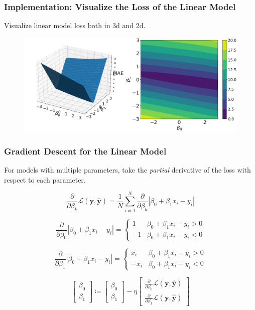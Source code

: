 \documentclass{beamer}
\begin{document}
\begin{frame}
\frametitle{Implementation: Visualize the Loss of the Linear Model}

Visualize linear model loss both in 3d and 2d.

\begin{figure}
\includegraphics[width=\textwidth]{../figures/linear_loss.png}
\end{figure}


\end{frame}

\begin{frame}
\frametitle{Gradient Descent for the Linear Model}

For models with multiple parameters, take the \emph{partial} derivative of the loss with respect to each parameter. 

\[
\frac{\partial}{\partial\beta_{k}}\mathcal{L}(\mathbf{y},\hat{\mathbf{y}})=\frac{1}{N}\sum_{i=1}^{N}\frac{\partial}{\partial\beta_{k}}\left|\beta_{0}+\beta_{1}x_{i}-y_{i}\right|
\]

\[
\frac{\partial}{\partial\beta_{0}}\left|\beta_{0}+\beta_{1}x_{i}-y_{i}\right|=\begin{cases}
1 & \beta_{0}+\beta_{1}x_{i}-y_{i}>0\\
-1 & \beta_{0}+\beta_{1}x_{i}-y_{i}<0
\end{cases}
\]

\[
\frac{\partial}{\partial\beta_{1}}\left|\beta_{0}+\beta_{1}x_{i}-y_{i}\right|=\begin{cases}
x_{i} & \beta_{0}+\beta_{1}x_{i}-y_{i}>0\\
-x_{i} & \beta_{0}+\beta_{1}x_{i}-y_{i}<0
\end{cases}
\]

\[
\left[\begin{array}{c}
\beta_{0}\\
\beta_{1}
\end{array}\right]\coloneqq\left[\begin{array}{c}
\beta_{0}\\
\beta_{1}
\end{array}\right]-\eta\left[\begin{array}{c}
\frac{\partial}{\partial\beta_{0}}\mathcal{L}(\mathbf{y},\hat{\mathbf{y}})\\
\frac{\partial}{\partial\beta_{1}}\mathcal{L}(\mathbf{y},\hat{\mathbf{y}})
\end{array}\right]
\]

\end{frame}
\end{document}
